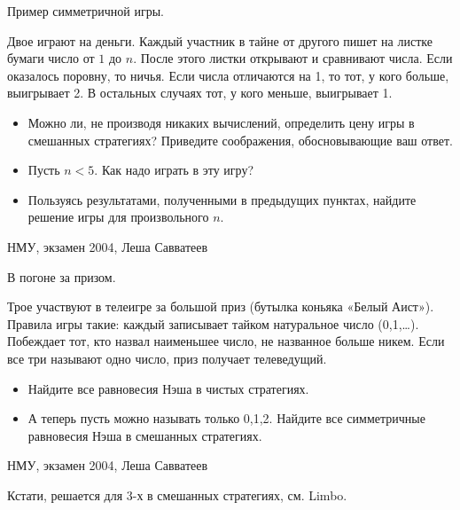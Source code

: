 \begin{problem}
 Пример симметричной игры.

Двое играют на деньги. Каждый участник в тайне от другого пишет на листке бумаги число от $1$ до $n$. После этого листки открывают и сравнивают числа. Если оказалось поровну, то ничья. Если числа отличаются на 1, то тот, у кого больше, выигрывает 2. В остальных случаях тот, у кого меньше, выигрывает 1.
\begin{itemize}
\item Можно ли, не производя никаких вычислений, определить цену игры в смешанных стратегиях? Приведите соображения, обосновывающие ваш ответ.
\item Пусть $n<5$. Как надо играть в эту игру?
\item Пользуясь результатами, полученными в предыдущих пунктах, найдите решение игры для произвольного $n$.
\end{itemize}



\begin{source}
НМУ, экзамен 2004, Леша Савватеев
\end{source}


\begin{sol}

\end{sol}
\end{problem}




\begin{problem}
В погоне за призом.

Трое участвуют в телеигре за большой приз (бутылка коньяка «Белый Аист»). Правила игры такие: каждый записывает тайком натуральное число (0,1,\ldots ). Побеждает тот, кто назвал наименьшее число, не названное больше никем. Если все три называют одно число, приз получает телеведущий.
\begin{itemize}
\item Найдите все равновесия Нэша в чистых стратегиях.
\item А теперь пусть можно называть только 0,1,2. Найдите все симметричные равновесия Нэша в смешанных стратегиях.
\end{itemize}



\begin{source}
НМУ, экзамен 2004, Леша Савватеев
\end{source}


\begin{sol}
Кстати, решается для 3-х в смешанных стратегиях, см. Limbo.
\end{sol}
\end{problem}



